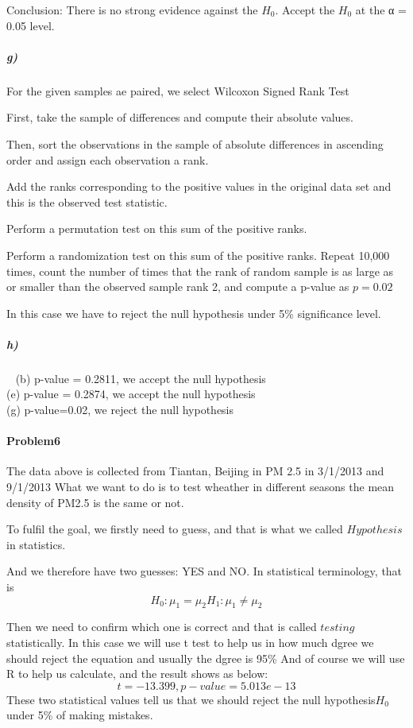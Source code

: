 \documentclass{article}
\begin{document}
Conclusion: There is no strong evidence against the $H_0$. Accept the $H_0$ at the α = 0.05 level. 
\subparagraph{g)}
For the given samples ae paired, we select Wilcoxon Signed Rank Test 

First, take the sample of differences and compute their absolute values. 

Then, sort the observations in the sample of absolute differences in ascending order and assign each observation a rank. 

 Add the ranks corresponding to the positive values in the original data set and this is the observed test statistic.

Perform a permutation test on this sum of the positive ranks.

Perform a randomization test on this sum of the positive ranks. Repeat 10,000 times, count the number of times that the rank of random sample is as large as or smaller than the observed sample rank 2, and compute a p-value as $p=0.02$

In this case we have to reject the null hypothesis under 5\% significance level.
\subparagraph{h)}~{}
\newline
(b) p-value = 0.2811, we accept the null hypothesis\\
(e) p-value = 0.2874, we accept the null hypothesis\\
(g) p-value=0.02, we reject the null hypothesis
\newpage
\paragraph{Problem6}

The data above is collected from Tiantan, Beijing in PM 2.5 in 3/1/2013 and 9/1/2013
What we want to do is to test wheather in different seasons the mean density of PM2.5 is the same or not.

To fulfil the goal, we firstly need to guess, and that is what we called $Hypothesis$ in statistics.

And we therefore have two guesses: YES and NO. In statistical terminology, that is \[H_0 : \mu_1 = \mu_2  H_1 : \mu_1 \neq \mu_2\]

Then we need to confirm which one is correct and that is called $testing$ statistically. In this case we will use t test to help us in how much dgree we should reject the equation and usually the dgree is 95\%
And of course we will use R to help us calculate, and the result shows as below:\[t = -13.399,  p-value = 5.013e-13\]
These two statistical values tell us that we should reject the null hypothesis$H_0$  under 5\% of making mistakes.
\end{document}
